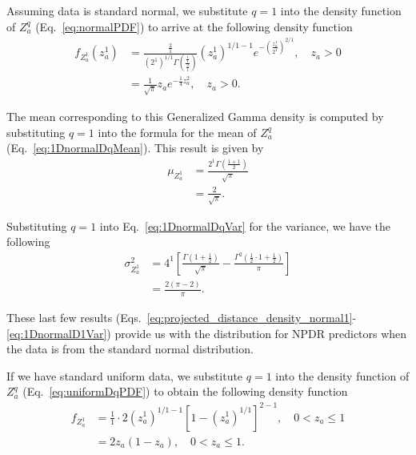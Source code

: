 \documentclass[10pt,letterpaper]{article}
\begin{document}
Assuming data is standard normal, we substitute $q=1$ into the density function of $Z^q_a$ (Eq.~\ref{eq:normalPDF}) to arrive at the following density function
%
\begin{equation}\label{eq:projected_distance_density_normal1}
\begin{aligned}
f_{Z^1_a}\left(z^1_a\right) &= \frac{\frac{2}{1}}{\left(2^1\right)^{1/1}\Gamma\left(\frac{\frac{1}{1}}{\frac{2}{1}}\right)}\left(z^1_a\right)^{1/1 - 1} e^{-\left(\frac{z^1_a}{2^1}\right)^{2/1}}, \quad z_a > 0\\
&= \frac{1}{\sqrt{\pi}} z_a e^{-\frac{1}{4}z^2_a}, \quad z_a > 0.
\end{aligned}
\end{equation}

The mean corresponding to this Generalized Gamma density is computed by substituting $q=1$ into the formula for the mean of $Z^q_a$ (Eq.~\ref{eq:1DnormalDqMean}). This result is given by
%
\begin{equation}\label{eq:1DnormalD1Mean}
\begin{aligned}
\mu_{Z^1_a} &= \frac{2^1 \Gamma\left(\frac{1 + 1}{2}\right)}{\sqrt{\pi}} \\
&= \frac{2}{\sqrt{\pi}}.
\end{aligned}
\end{equation}

Substituting $q=1$ into Eq.~\ref{eq:1DnormalDqVar} for the variance, we have the following
%
\begin{equation}\label{eq:1DnormalD1Var}
\begin{aligned}
\sigma^2_{Z^1_a} &= 4^1\left[\frac{\Gamma\left(1 + \frac{1}{2}\right)}{\sqrt{\pi}} - \frac{\Gamma^2\left(\frac{1}{2}\cdot 1 + \frac{1}{2}\right)}{\pi}\right] \\
&= \frac{2(\pi-2)}{\pi}.
\end{aligned}
\end{equation}

These last few results (Eqs.~\ref{eq:projected_distance_density_normal1}-\ref{eq:1DnormalD1Var}) provide us with the distribution for NPDR predictors when the data is from the standard normal distribution. 

If we have standard uniform data, we substitute $q=1$ into the density function of $Z^q_a$ (Eq.~\ref{eq:uniformDqPDF}) to obtain the following density function
%
\begin{equation}\label{eq:projected_distance_density_uniform1}
\begin{aligned}
f_{Z^1_a} &= \frac{1}{1}\cdot 2\left(z^1_a\right)^{1/1 - 1}\left[1 - \left(z^1_a\right)^{1/1}\right]^{2-1}, \quad 0 < z_a \leq 1 \\
&= 2z_a(1 - z_a), \quad 0 < z_a \leq 1.
\end{aligned}
\end{equation}
\end{document}
